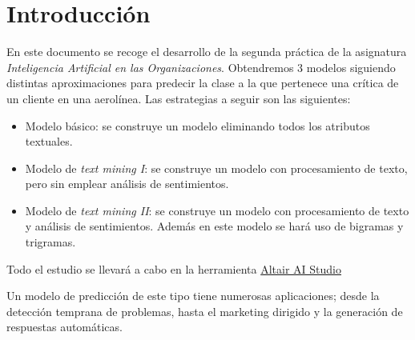 \documentclass[12pt]{report} %
\begin{document}
\newpage %
\thispagestyle{empty}
\mbox{}


\tableofcontents
\thispagestyle{fancy}

\newpage %
\thispagestyle{empty}
\mbox{}

 \listoffigures
 \thispagestyle{fancy}

 \newpage %
 \thispagestyle{empty}
 \mbox{}

\listoftables
 \thispagestyle{fancy}

 \newpage %
 \thispagestyle{empty}
 \mbox{}


\clearpage
{} %


\chapter{Introducción}
\label{chap:intro}
En este documento se recoge el desarrollo de la segunda práctica de la asignatura \textit{Inteligencia Artificial en las Organizaciones}. Obtendremos 3 modelos siguiendo distintas aproximaciones para predecir la clase a la que pertenece una crítica de un cliente en una aerolínea. Las estrategias a seguir son las siguientes: 
\begin{itemize}
    \item Modelo básico: se construye un modelo eliminando todos los atributos textuales.
    \item Modelo de \textit{text mining I}: se construye un modelo con procesamiento de texto, pero sin emplear análisis de sentimientos.
    \item Modelo de \textit{text mining II}: se construye un modelo con procesamiento de texto y análisis de sentimientos. Además en este modelo se hará uso de bigramas y trigramas.
\end{itemize}
Todo el estudio se llevará a cabo en la herramienta \href{https://altair.com/altair-ai-studio}{Altair AI Studio}

Un modelo de predicción de este tipo tiene numerosas aplicaciones; desde la detección temprana de problemas, hasta el marketing dirigido y la generación de respuestas automáticas.
\end{document}
